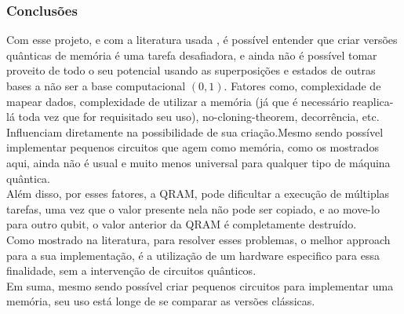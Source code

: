 \documentclass{article}
\begin{document}
\subsubsection{Conclusões}
Com esse projeto, e com a literatura usada \cite{jaques2023qram}\cite{Giovannetti_2008}, é possível entender que criar versões quânticas de memória é uma tarefa desafiadora, e ainda não é possível tomar proveito de todo o seu potencial usando as superposições e estados de outras bases a não ser a base computacional $({0,1})$. Fatores como, complexidade de mapear dados, complexidade de utilizar a memória (já que é necessário reaplica-lá toda vez que for requisitado seu uso), no-cloning-theorem, decorrência, etc. Influenciam diretamente na possibilidade de sua criação.Mesmo sendo possível implementar pequenos circuitos que agem como memória, como os mostrados aqui, ainda não é usual e muito menos universal para qualquer tipo de máquina quântica.\\
Além disso, por esses fatores, a QRAM, pode dificultar a execução de múltiplas tarefas, uma vez que o valor presente nela não pode ser copiado, e ao move-lo para outro qubit, o valor anterior da QRAM é completamente destruído.\\
Como mostrado na literatura, para resolver esses problemas, o melhor approach para a sua implementação, é a utilização de um hardware especifico para essa finalidade, sem a intervenção de circuitos quânticos.\\ 
Em suma, mesmo sendo possível criar pequenos circuitos para implementar uma memória, seu uso está longe de se comparar as versões clássicas.
\end{document}
